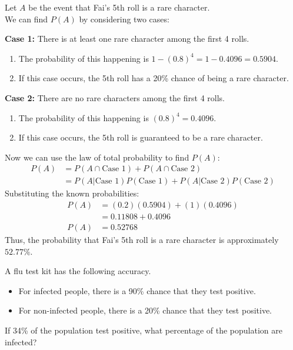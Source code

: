 \documentclass[a4paper, 10pt]{article}
\begin{document}
\begin{solution}
Let \( A \) be the event that Fai's 5th roll is a rare character. \\
We can find \( P(A) \) by considering two cases:
\\
\par\noindent\textbf{Case 1:} There is at least one rare character among the first 4 rolls.
\begin{enumerate}
    \item The probability of this happening is \( 1 - (0.8)^4 = 1 - 0.4096 = 0.5904 \).
    \item If this case occurs, the 5th roll has a 20\% chance of being a rare character.
\end{enumerate}

\par\noindent\textbf{Case 2:} There are no rare characters among the first 4 rolls.
\begin{enumerate}
    \item The probability of this happening is \( (0.8)^4 = 0.4096 \).
    \item If this case occurs, the 5th roll is guaranteed to be a rare character.
\end{enumerate}

Now we can use the law of total probability to find \( P(A) \):
\begin{align*}  
    P(A) &= P(A \cap \text{Case 1}) + P(A \cap \text{Case 2}) \\
    &= P(A | \text{Case 1})P(\text{Case 1}) + P(A | \text{Case 2})P(\text{Case 2})
\end{align*}
Substituting the known probabilities:
\begin{align*}  
    P(A) &= (0.2)(0.5904) + (1)(0.4096) \\
    &= 0.11808 + 0.4096 \\
    P(A) &= 0.52768
\end{align*}
Thus, the probability that Fai's 5th roll is a rare character is approximately \( \boxed{52.77\%} \).
\end{solution}


\begin{problem}
A flu test kit has the following accuracy.
\begin{itemize}[wide=0pt, itemsep=2pt, parsep=0pt, leftmargin=*]
    \item For infected people, there is a 90\% chance that they test positive.
    \item For non-infected people, there is a 20\% chance that they test positive.
\end{itemize}
If 34\% of the population test positive, what percentage of the population are infected?
\end{problem}
\end{document}
